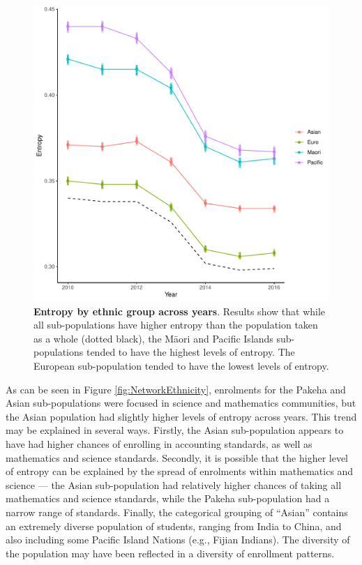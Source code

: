 \begin{figure}[h]
    \centering
    \includegraphics[width = \textwidth]{C2 - Student Pathways/Entropy_Ethnicity.pdf}
    \caption{\textbf{Entropy by ethnic group across years}. Results show that while all sub-populations have higher entropy than the population taken as a whole (dotted black), the M\={a}ori and Pacific Islands sub-populations tended to have the highest levels of entropy. The European sub-population tended to have the lowest levels of entropy. 
    }
    
    \label{fig:Entropy_Ethnicity}
\end{figure}



As can be seen in Figure \ref{fig:NetworkEthnicity}, enrolments for the Pakeha and Asian sub-populations were focused in science and mathematics communities, but the Asian population had slightly higher levels of entropy across years. This trend may be explained in several ways. Firstly, the Asian sub-population appears to have had higher chances of enrolling in accounting standards, as well as mathematics and science standards. Secondly, it is possible that the higher level of entropy can be explained by the spread of enrolments within mathematics and science --- the Asian sub-population had relatively higher chances of taking all mathematics and science standards, while the Pakeha sub-population had a narrow range of standards. Finally, the categorical grouping of ``Asian'' contains an extremely diverse population of students, ranging from India to China, and also including some Pacific Island Nations (e.g., Fijian Indians). The diversity of the population may have been reflected in a diversity of enrollment patterns. 

